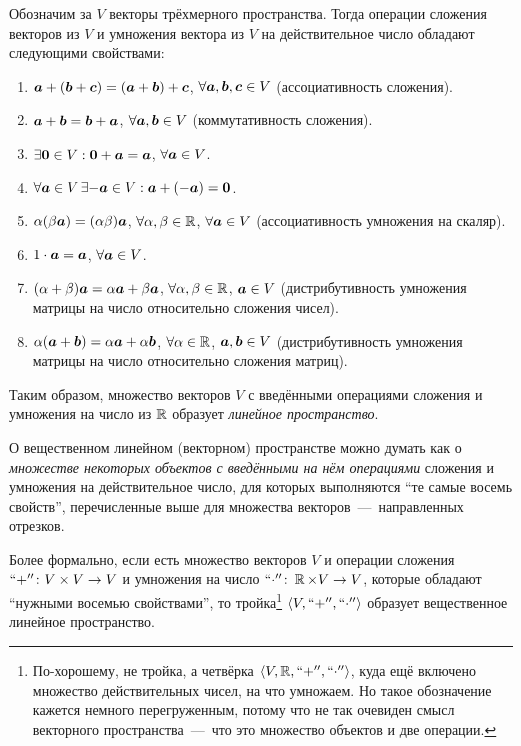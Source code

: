 \documentclass[a4paper,12pt]{article}
\begin{document}
  \begin{remark}
    Обозначим за $V$ векторы трёхмерного пространства.
    Тогда операции сложения векторов из $V$ и умножения вектора из $V$ на действительное число обладают следующими свойствами:
    \begin{enumerate}
      \item $\boldsymbol a + (\boldsymbol b + \boldsymbol c) = (\boldsymbol a + \boldsymbol b) + \boldsymbol c$, $\forall \boldsymbol a, \boldsymbol b, \boldsymbol c \in V$ (ассоциативность сложения).
      \item $\boldsymbol a + \boldsymbol b = \boldsymbol b + \boldsymbol a$, $\forall \boldsymbol a, \boldsymbol b \in V$ (коммутативность сложения).
      \item $\exists \boldsymbol 0 \in V: \boldsymbol 0 + \boldsymbol a = \boldsymbol a$, $\forall \bds a \hm\in V$.
      \item $\forall \boldsymbol a \in V\, \exists {-\boldsymbol a} \in V: \boldsymbol a + ({-\boldsymbol a}) = \boldsymbol 0$.
      \item $\alpha (\beta \boldsymbol a) = (\alpha \beta) \boldsymbol a$, $\forall \alpha, \beta \in \operatorname{\mathbb R}$, $\forall \bds a \hm\in V$ (ассоциативность умножения на скаляр).
      \item $1 \cdot \boldsymbol a = \boldsymbol a$, $\forall \boldsymbol a \in V$.
      \item $(\alpha + \beta) \boldsymbol a = \alpha \boldsymbol a + \beta \boldsymbol a$, $\forall \alpha, \beta \hm\in \RR$, $\bds a \hm\in V$ (дистрибутивность умножения матрицы на число относительно сложения чисел).
      \item $\alpha (\boldsymbol a + \boldsymbol b) = \alpha \boldsymbol a + \alpha \boldsymbol b$, $\forall \alpha \hm\in \RR$, $\bds a, \bds b \hm\in V$ (дистрибутивность умножения матрицы на число относительно сложения матриц).
    \end{enumerate}
  \end{remark}
  
  Таким образом, множество векторов $V$ с введёнными операциями сложения и умножения на число из $\operatorname{\mathbb R}$ образует \emph{линейное пространство}.
  
  \begin{definition}
    О вещественном линейном (векторном) пространстве можно думать как о \emph{множестве некоторых объектов с введёнными на нём операциями} сложения и умножения на действительное число, для которых выполняются ``те самые восемь свойств'', перечисленные выше для множества векторов~---~направленных отрезков.
    
    Более формально, если есть множество векторов $V$ и операции сложения ${``+''}\colon V \hm\times V \hm\to V$ и умножения на число ${``\cdot''}\colon \RR \hm\times V \hm\to V$, которые обладают ``нужными восемью свойствами'', то тройка\footnote{По-хорошему, не тройка, а четвёрка $\langle V, \operatorname{\mathbb R}, {``+''}, {``\cdot''}\rangle$, куда ещё включено множество действительных чисел, на что умножаем. Но такое обозначение кажется немного перегруженным, потому что не так очевиден смысл векторного пространства~---~что это множество объектов и две операции.} $\langle V, {``+''}, {``\cdot''}\rangle$ образует вещественное линейное пространство.
  \end{definition}
  
\end{document}
